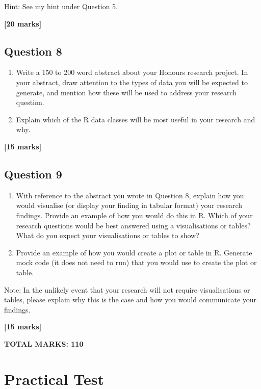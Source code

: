 \documentclass[
  10t,
]{article}
\providecommand{\tightlist}{%
  \setlength{\itemsep}{0pt}\setlength{\parskip}{0pt}}\usepackage{longtable,booktabs,array}
\begin{document}
Hint: See my hint under Question 5.

\textbf{{[}20 marks{]}}

\subsection{Question 8}\label{question-8}

\begin{enumerate}
\def\labelenumi{\alph{enumi}.}
\tightlist
\item
  Write a 150 to 200 word abstract about your Honours research project.
  In your abstract, draw attention to the types of data you will be
  expected to generate, and mention how these will be used to address
  your research question.
\item
  Explain which of the R data classes will be most useful in your
  research and why.
\end{enumerate}

\textbf{{[}15 marks{]}}

\subsection{Question 9}\label{question-9}

\begin{enumerate}
\def\labelenumi{\alph{enumi}.}
\tightlist
\item
  With reference to the abstract you wrote in Question 8, explain how
  you would visualise (or display your finding in tabular format) your
  research findings. Provide an example of how you would do this in R.
  Which of your research questions would be best answered using a
  visualisations or tables? What do you expect your visualisations or
  tables to show?
\item
  Provide an example of how you would create a plot or table in R.
  Generate mock code (it does not need to run) that you would use to
  create the plot or table.
\end{enumerate}

Note: In the unlikely event that your research will not require
visualisations or tables, please explain why this is the case and how
you would communicate your findings.

\textbf{{[}15 marks{]}}

\textbf{TOTAL MARKS: 110}

\section{Practical Test}\label{practical-test}
\end{document}
